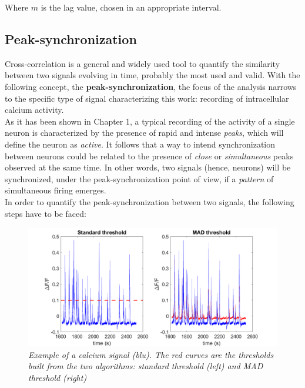 \documentclass[a4paper]{article}
\begin{document}
Where $m$ is the lag value, chosen in an appropriate interval.



\subsection{Peak-synchronization}

Cross-correlation is a general and widely used tool to quantify the similarity between two signals evolving in time, probably the most used and valid. With the following concept, the \textbf{peak-synchronization}, the focus of the analysis narrows to the specific type of signal characterizing this work: recording of intracellular calcium activity.\\
As it has been shown in Chapter 1, a typical recording of the activity of a single neuron is characterized by the presence of rapid and intense \textit{peaks}, which will define the neuron as \textit{active}. It follows that a way to intend synchronization between neurons could be related to the presence of \textit{close} or \textit{simultaneous} peaks observed at the same time. In other words, two signals (hence, neurons) will be synchronized, under the peak-synchronization point of view, if a \textit{pattern} of simultaneous firing emerges. 
\\

In order to quantify the peak-synchronization between two signals, the following steps have to be faced:

\begin{figure}[H]
	\begin{center}
		\hspace*{-3cm}
		\includegraphics[scale=.50]{thresholds.png} 
	\end{center} 
	\caption{\textit{Example of a calcium signal (blu). The red curves are the thresholds built from the two algorithms: standard threshold (left) and MAD threshold (right)}}
	
\end{figure}
\end{document}

